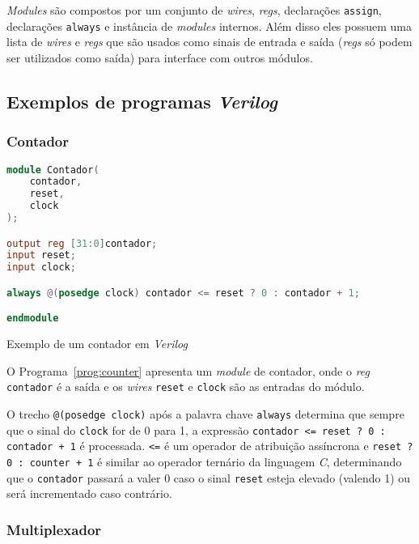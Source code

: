 \emph{Modules} são compostos por um conjunto de \emph{wires}, \emph{regs}, declarações \texttt{assign},
declarações \texttt{always} e instância de \emph{modules} internos. Além disso eles possuem uma lista de \emph{wires}
e \emph{regs} que são usados como sinais de entrada e saída (\emph{regs} só podem ser utilizados como saída)
para interface com outros módulos.

\subsection{Exemplos de programas \emph{Verilog}}
\label{sec:exverilog}

\subsubsection{Contador}
\label{ssec:counter}

\begin{program}
  \centering

\begin{lstlisting}[language=Verilog, style=wider]
module Contador(
    contador,
    reset,
    clock
);

output reg [31:0]contador;
input reset;
input clock;

always @(posedge clock) contador <= reset ? 0 : contador + 1;

endmodule
\end{lstlisting}

  \caption{Exemplo de um contador em \emph{Verilog}\label{prog:counter}}
\end{program}

O Programa~\ref{prog:counter} apresenta um \emph{module} de contador,
onde o \emph{reg} \texttt{contador} é a saída e os \emph{wires}
\texttt{reset} e \texttt{clock} são as entradas do módulo.

O trecho \texttt{@(posedge clock)} após a palavra chave
\texttt{always} determina que sempre que o sinal do \texttt{clock} for de
0 para 1, a expressão \texttt{contador <= reset ? 0 : contador + 1}
é processada. \texttt{<=} é um operador de atribuição assíncrona e
\texttt{reset ? 0 : counter + 1} é similar ao operador ternário da linguagem
\emph{C}, determinando que o  \texttt{contador} passará a valer 0
caso o sinal \texttt{reset} esteja elevado (valendo 1) ou será incrementado
caso contrário.

\subsubsection{Multiplexador}
\label{ssec:mux}

